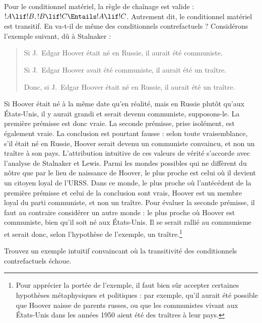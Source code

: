 \documentclass[../../../include/open-logic-section]{subfiles}
\begin{document}


Pour le conditionnel matériel, la règle de chaînage est valide :
$!A \lif !B, !B \lif !C \Entails !A \lif !C$. Autrement dit, le
conditionnel matériel est transitif. En va-t-il de même des
conditionnels contrefactuels ? Considérons l'exemple suivant, dû à
Stalnaker :
\begin{quote}
  Si J.~Edgar Hoover était né en Russie, il aurait été communiste.

  Si J.~Edgar Hoover avait été communiste, il aurait été un traître.

  Donc, si J.~Edgar Hoover était né en Russie, il aurait été un
  traître.
\end{quote}
Si Hoover était né à la même date qu'en réalité, mais en Russie
plutôt qu'aux États-Unis, il y aurait grandi et serait devenu
communiste, supposons-le. La première prémisse est donc vraie. La
seconde prémisse, prise isolément, est également vraie. La conclusion
est pourtant fausse : selon toute vraisemblance, s'il était né en
Russie, Hoover serait devenu un communiste convaincu, et non un
traître à son pays. L'attribution intuitive de ces valeurs de vérité
s'accorde avec l'analyse de Stalnaker et Lewis. Parmi les mondes
possibles qui ne diffèrent du nôtre que par le lieu de naissance de
Hoover, le plus proche est celui où il devient un citoyen loyal de
l'URSS. Dans ce monde, le plus proche où l'antécédent de la première
prémisse et celui de la conclusion sont vrais, Hoover est un membre
loyal du parti communiste, et non un traître. Pour évaluer la seconde
prémisse, il faut au contraire considérer un autre monde : le plus
proche où Hoover est communiste, bien qu'il soit né aux États-Unis.
Il se serait rallié au communisme et serait donc, selon l'hypothèse de
l'exemple, un traître.\footnote{Pour apprécier la portée de
  l'exemple, il faut bien sûr accepter certaines hypothèses
  métaphysiques et politiques : par exemple, qu'il aurait été
  possible que Hoover naisse de parents russes, ou que les
  communistes vivant aux États-Unis dans les années 1950 aient été
  des traîtres à leur pays.}

\begin{prob}
  Trouvez un exemple intuitif convaincant où la transitivité des
  conditionnels contrefactuels échoue.
\end{prob}
\end{document}
